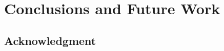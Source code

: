 \documentclass[sigconf]{acmart}
\begin{document}
\section{Conclusions and Future Work}
\label{sec:conclusion}


\subsection*{Acknowledgment}



 
\end{document}
